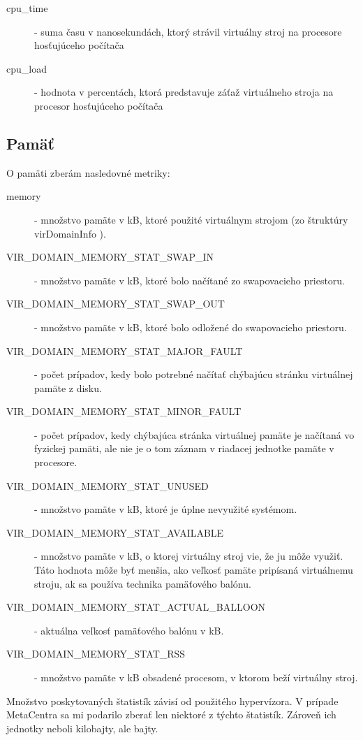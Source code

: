 \documentclass[printed,11pt,twoside,color,cover,table]{fithesis3}
\begin{document}
\begin{description}
\item[cpu\_time] - suma času v nanosekundách, ktorý strávil virtuálny stroj na procesore hosťujúceho počítača \cite{libvirt-cpu}
\item[cpu\_load] - hodnota v percentách, ktorá predstavuje záťaž virtuálneho stroja na procesor hosťujúceho počítača
\end{description}

\subsection{Pamäť}
O pamäti zberám nasledovné metriky:
\begin{description}
\item[memory] - množstvo pamäte v kB, ktoré použité virtuálnym strojom (zo štruktúry virDomainInfo \cite{libvirt-domain-info}).
\item[VIR\_DOMAIN\_MEMORY\_STAT\_SWAP\_IN] - množstvo pamäte v kB, ktoré bolo načítané zo swapovacieho priestoru.
\item[VIR\_DOMAIN\_MEMORY\_STAT\_SWAP\_OUT] - množstvo pamäte v kB, ktoré bolo odložené do swapovacieho priestoru.
\item[VIR\_DOMAIN\_MEMORY\_STAT\_MAJOR\_FAULT] - počet prípadov, kedy bolo potrebné načítať chýbajúcu stránku virtuálnej pamäte z disku.
\item[VIR\_DOMAIN\_MEMORY\_STAT\_MINOR\_FAULT] - počet prípadov, kedy chýbajúca stránka virtuálnej pamäte je načítaná vo fyzickej pamäti, ale nie je o tom záznam v riadacej jednotke pamäte v procesore.
\item[VIR\_DOMAIN\_MEMORY\_STAT\_UNUSED] - množstvo pamäte v kB, ktoré je úplne nevyužité systémom.
\item[VIR\_DOMAIN\_MEMORY\_STAT\_AVAILABLE] - množstvo pamäte v kB, o ktorej virtuálny stroj vie, že ju môže využiť. Táto hodnota môže byť menšia, ako veľkosť pamäte pripísaná virtuálnemu stroju, 
ak sa používa technika pamäťového balónu.
\item[VIR\_DOMAIN\_MEMORY\_STAT\_ACTUAL\_BALLOON] - aktuálna veľkosť pamäťového balónu v kB.
\item[VIR\_DOMAIN\_MEMORY\_STAT\_RSS] - množstvo pamäte v kB obsadené procesom, v ktorom beží virtuálny stroj.
\cite{libvirt-mem}
\end{description}
Množstvo poskytovaných štatistík závisí od použitého hypervízora. V prípade MetaCentra sa mi podarilo zberať len niektoré z týchto štatistík. Zároveň ich jednotky neboli kilobajty, ale bajty.
\end{document}
